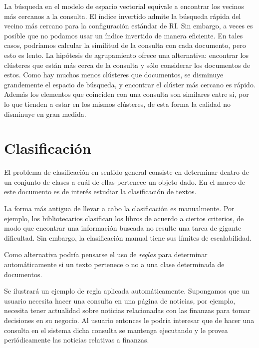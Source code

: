 \documentclass{llncs}
\begin{document}
\begin{itemize}
	La búsqueda en el modelo de espacio vectorial equivale a encontrar los vecinos más cercanos a la consulta. El índice invertido admite la búsqueda rápida del vecino más cercano para la configuración estándar de RI. Sin embargo, a veces es posible que no podamos usar un índice invertido de manera eficiente. En tales casos, podríamos calcular la similitud de la consulta con cada documento, pero esto es lento. La hipótesis de agrupamiento ofrece una alternativa: encontrar los cl\'usteres que están más cerca de la consulta y sólo considerar los documentos de estos. Como hay muchos menos clústeres que documentos, se disminuye grandemente el espacio de b\'usqueda, y encontrar el clúster más cercano es rápido. Adem\'as los elementos que coinciden con una consulta son similares entre sí, por lo que tienden a estar en los mismos cl\'usteres, de esta forma la calidad no disminuye en gran medida.
\end{itemize}

\section{Clasificaci\'on}

	El problema de clasificaci\'on en sentido general consiste en determinar dentro de un conjunto de clases a cu\'al de ellas pertenece un objeto dado. En el marco de este documento es de inter\'es estudiar la clasificaci\'on de textos. 
	
%	
	La forma m\'as antigua de llevar a cabo la clasificaci\'on es manualmente. Por ejemplo, los bibliotecarios clasifican los libros de acuerdo a ciertos criterios, de modo que encontrar una informaci\'on buscada no resulte una tarea de gigante dificultad. Sin embargo, la clasificaci\'on manual tiene sus l\'imites de escalabilidad. 
	
	Como alternativa podr\'ia pensarse el uso de \emph{reglas} para determinar autom\'aticamente si un texto pertenece o no a una clase determinada de documentos.
	
	Se ilustrar\'a un ejemplo de regla aplicada autom\'aticamente. Supongamos que un usuario necesita hacer una consulta en una p\'agina de noticias, por ejemplo, necesita tener actualidad sobre noticias relacionadas con las finanzas para tomar decisiones en su negocio. Al usuario entonces le podr\'ia interesar que de hacer una consulta en el sistema dicha consulta se mantenga ejecutando y le provea peri\'odicamente las noticias relativas a finanzas. 
	
\end{document}
